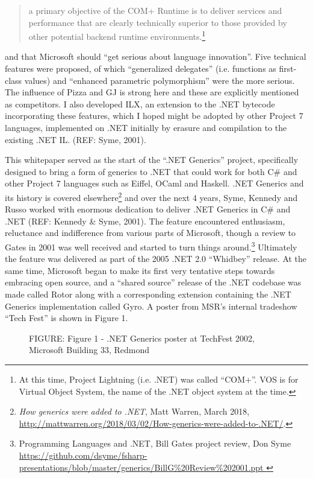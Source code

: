 \documentclass[acmsmall,review]{acmart}\settopmatter{printfolios=true,printccs=false,printacmref=false}
\begin{document}
\begin{quote}
a primary objective of the COM+ Runtime is to deliver services and performance that are clearly technically superior to those provided by other potential backend runtime environments.\footnote{At this time, Project Lightning (i.e. .NET) was called “COM+”.  VOS is for Virtual Object System, the name of the .NET object system at the time.} 
\end{quote}
and that Microsoft should “get serious about language innovation”.  Five technical features were proposed, of which “generalized delegates” (i.e. functions as first-class values) and “enhanced parametric polymorphism” were the more serious.  The influence of Pizza and GJ is strong here and these are explicitly mentioned as competitors. I also developed ILX, an extension to the .NET bytecode incorporating these features, which I hoped might be adopted by other Project 7 languages, implemented on .NET initially by erasure and compilation to the existing .NET IL. (REF: Syme, 2001).


This whitepaper served as the start of the “.NET Generics” project, specifically designed to bring a form of generics to .NET that could work for both C\# and other Project 7 languages such as Eiffel, OCaml and Haskell. .NET Generics and its history is covered elsewhere\footnote{\textit{How generics were added to .NET}, Matt Warren, March 2018, \url{http://mattwarren.org/2018/03/02/How-generics-were-added-to-.NET/}.} and over the next 4 years, Syme, Kennedy and Russo worked with enormous dedication to deliver .NET Generics in C\# and .NET (REF: Kennedy \& Syme, 2001). The feature encountered enthusiasm, reluctance and indifference from various parts of Microsoft, though a review to Gates in 2001 was well received and started to turn things around.\footnote{ Programming Languages and  .NET, Bill Gates project review, Don Syme \url{https://github.com/dsyme/fsharp-presentations/blob/master/generics/BillG\%20Review\%202001.ppt }}   Ultimately the feature was delivered as part of the 2005 .NET 2.0 “Whidbey” release.  At the same time, Microsoft began to make its first very tentative steps towards embracing open source, and a “shared source” release of the .NET codebase was made called Rotor along with a corresponding extension containing the .NET Generics implementation called Gyro.  A poster from MSR’s internal tradeshow “Tech Fest” is shown in Figure 1. 

\begin{figure}

FIGURE: Figure 1 - .NET Generics poster at TechFest 2002, Microsoft Building 33, Redmond
\end{figure}
\end{document}
